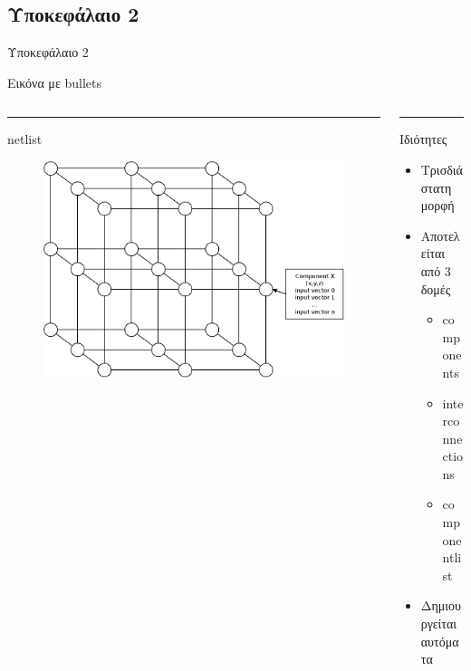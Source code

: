 \documentclass[12pt,t,aspectratio=169,xcolor=table]{beamer}
\begin{document}
\subsection{Υποκεφάλαιο 2}
\begin{frame}[plain,c]
\begin{center}
\Huge Υποκεφάλαιο 2
\end{center}
\end{frame}

\begin{frame}{Εικόνα με bullets}
\begin{columns}[T] %
\begin{column}{.48\textwidth}
\color{red}\rule{\linewidth}{4pt}
netlist
\bigskip
	\begin{figure}[h!]
	\vspace*{-1em}
		\includegraphics[scale=0.2]{ahdl_hypercube}
	\end{figure}
\end{column}%
\hfill%
\begin{column}{.48\textwidth}
\color{subtitle}\rule{\linewidth}{4pt}

Ιδιότητες
\bigskip
\begin{itemize}
  \setlength\itemsep{0.15cm}
  \item Τρισδιάστατη μορφή
  \item Αποτελείται από 3 δομές
  \begin{itemize}
	  \item components
	  \item interconnections
	  \item componentlist
  \end{itemize}
  \item Δημιουργείται αυτόματα 
\end{itemize}
\end{column}%
\end{columns}	
\end{frame}
\end{document}
